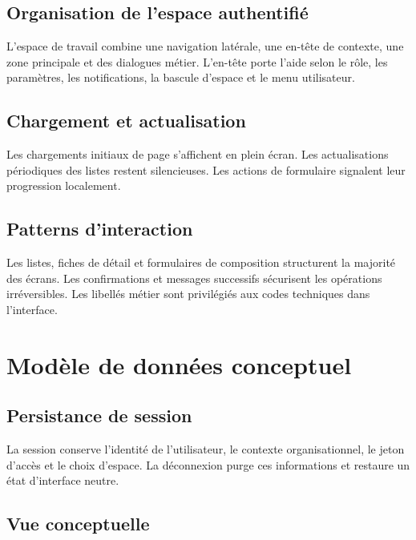 \documentclass[12pt,a4paper]{report}
\begin{document}
\section{Organisation de l'espace authentifié}

L'espace de travail combine une navigation latérale, une en-tête de contexte, une zone principale et des dialogues métier. L'en-tête porte l'aide selon le rôle, les paramètres, les notifications, la bascule d'espace et le menu utilisateur.

\section{Chargement et actualisation}

Les chargements initiaux de page s'affichent en plein écran. Les actualisations périodiques des listes restent silencieuses. Les actions de formulaire signalent leur progression localement.

\section{Patterns d'interaction}

Les listes, fiches de détail et formulaires de composition structurent la majorité des écrans. Les confirmations et messages successifs sécurisent les opérations irréversibles. Les libellés métier sont privilégiés aux codes techniques dans l'interface.

\chapter{Modèle de données conceptuel}

\section{Persistance de session}

La session conserve l'identité de l'utilisateur, le contexte organisationnel, le jeton d'accès et le choix d'espace. La déconnexion purge ces informations et restaure un état d'interface neutre.

\section{Vue conceptuelle}
\end{document}
